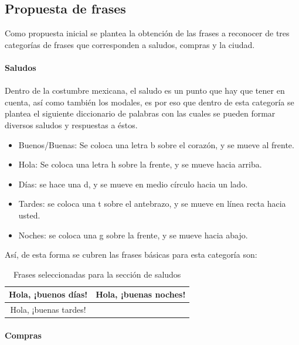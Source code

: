 \subsection{Propuesta de frases}

Como propuesta inicial se plantea la obtención de las frases a reconocer de tres categorías de frases que corresponden a saludos, compras y la ciudad.

\paragraph{Saludos}\paragraph{}

Dentro de la costumbre mexicana, el saludo es un punto que hay que tener en cuenta, así como también los modales, es por eso que dentro de esta categoría se plantea el siguiente diccionario de palabras con las cuales se pueden formar diversos saludos y respuestas a éstos.

\begin{itemize}
\item	Buenos/Buenas: Se coloca una letra b sobre el corazón, y se mueve al frente.
\item	Hola: Se coloca una letra h sobre la frente, y se mueve hacia arriba.
\item	Días: se hace una d, y se mueve en medio círculo hacia un lado.
\item	Tardes: se coloca una t sobre el antebrazo, y se mueve en línea recta hacia usted.
\item	Noches: se coloca una g sobre la frente, y se mueve hacia abajo.
\end{itemize}

Así, de esta forma se cubren las frases básicas para esta categoría son:

 
\begin{table}[H]
\centering
\caption{Frases seleccionadas para la sección de saludos}
\label{tb:saludosFrases}
\begin{tabular}{|c|c|}
\hline
Hola, ¡buenos días!   & Hola, ¡buenas noches! \\ \hline
Hola, ¡buenas tardes! &                       \\ \hline
\end{tabular}
\end{table}
 
\paragraph{Compras}\paragraph{}

